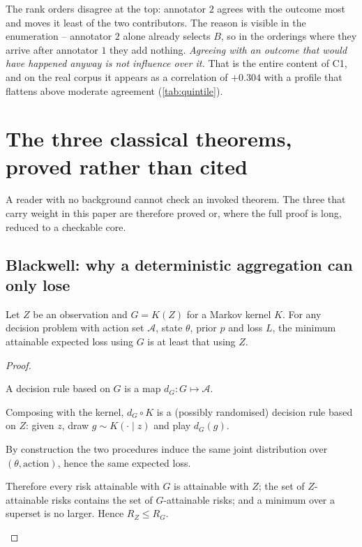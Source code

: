 The rank orders disagree at the top: annotator $2$ agrees with the outcome most
and moves it least of the two contributors. The reason is visible in the
enumeration -- annotator $2$ alone already selects $B$, so in the orderings where
they arrive after annotator $1$ they add nothing. \emph{Agreeing with an outcome
that would have happened anyway is not influence over it.} That is the entire
content of C1, and on the real corpus it appears as a correlation of $+0.304$
with a profile that flattens above moderate agreement (\cref{tab:quintile}).

\section{The three classical theorems, proved rather than cited}
\label{sec:classical}

A reader with no background cannot check an invoked theorem. The three that carry
weight in this paper are therefore proved or, where the full proof is long,
reduced to a checkable core.

\subsection{Blackwell: why a deterministic aggregation can only lose}

\begin{theorem}
\label{thm:blackwell-proof}
Let $Z$ be an observation and $G = K(Z)$ for a Markov kernel $K$. For any
decision problem with action set $\mathcal{A}$, state $\theta$, prior $p$ and
loss $L$, the minimum attainable expected loss using $G$ is at least that using
$Z$.
\end{theorem}
\begin{proof}
\begin{steps}
\item A decision rule based on $G$ is a map $d_G : G \mapsto \mathcal{A}$.
\item Composing with the kernel, $d_G \circ K$ is a (possibly
randomised) decision rule based on $Z$: given $z$, draw $g \sim K(\cdot\mid z)$
and play $d_G(g)$.
\item By construction the two procedures induce the same joint
distribution over $(\theta, \text{action})$, hence the same expected loss.
\item Therefore every risk attainable with $G$ is attainable with $Z$;
the set of $Z$-attainable risks contains the set of $G$-attainable risks; and a
minimum over a superset is no larger. Hence $R_Z \le R_G$.
\end{steps}
\end{proof}

